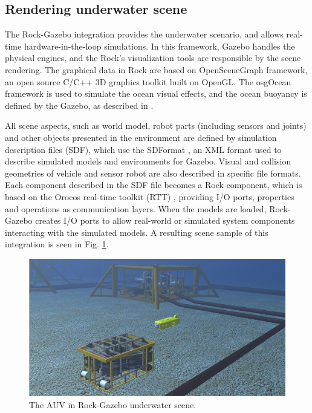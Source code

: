 \documentclass[final,5p,times]{elsarticle}
\begin{document}

\subsection{Rendering underwater scene}
\label{dev:uwscene}

The Rock-Gazebo integration \cite{watanabe2015} provides the underwater scenario, and allows real-time hardware-in-the-loop simulations. In this framework, Gazebo handles the physical engines, and the Rock's visualization tools are responsible by the scene rendering. The graphical data in Rock are based on OpenSceneGraph framework, an open source C/C++ 3D graphics toolkit built on OpenGL. The osgOcean framework is used to simulate the ocean visual effects, and the ocean buoyancy is defined by the Gazebo, as described in \cite{watanabe2015}.

All scene aspects, such as world model, robot parts (including sensors and joints) and other objects presented in the environment are defined by simulation description files (SDF), which use the SDFormat \cite{sdformat2017}, an XML format used to describe simulated models and environments for Gazebo. Visual and collision geometries of vehicle and sensor robot are also described in specific file formats. Each component described in the SDF file becomes a Rock component, which is based on the Orocos real-time toolkit (RTT) \cite{soetens2005}, providing I/O ports, properties and operations as communication layers. When the models are loaded, Rock-Gazebo creates I/O ports to allow real-world or simulated system components interacting with the simulated models. A resulting scene sample of this integration is seen in Fig. \ref{fig:uwscene}.

\begin{figure}[t]
    \includegraphics[width=\columnwidth]{figs/uwscene}
    \centering
    \captionsetup{justification=centering}
    \caption{The AUV in Rock-Gazebo underwater scene.}
    \label{fig:uwscene}
\end{figure}
\end{document}
